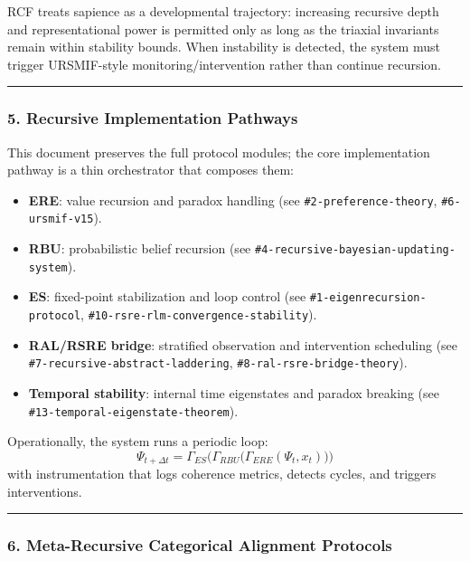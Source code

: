 \documentclass[
]{article}
\providecommand{\tightlist}{%
  \setlength{\itemsep}{0pt}\setlength{\parskip}{0pt}}
\begin{document}
RCF treats sapience as a developmental trajectory: increasing recursive
depth and representational power is permitted only as long as the
triaxial invariants remain within stability bounds. When instability is
detected, the system must trigger URSMIF-style monitoring/intervention
rather than continue recursion.

\begin{center}\rule{0.5\linewidth}{0.5pt}\end{center}

\subsubsection{\texorpdfstring{\textbf{5. Recursive Implementation
Pathways}}{5. Recursive Implementation Pathways}}\label{recursive-implementation-pathways}

This document preserves the full protocol modules; the core
implementation pathway is a thin orchestrator that composes them:

\begin{itemize}
\tightlist
\item
  \textbf{ERE}: value recursion and paradox handling (see
  \texttt{\#2-preference-theory}, \texttt{\#6-ursmif-v15}).
\item
  \textbf{RBU}: probabilistic belief recursion (see
  \texttt{\#4-recursive-bayesian-updating-system}).
\item
  \textbf{ES}: fixed-point stabilization and loop control (see
  \texttt{\#1-eigenrecursion-protocol},
  \texttt{\#10-rsre-rlm-convergence-stability}).
\item
  \textbf{RAL/RSRE bridge}: stratified observation and intervention
  scheduling (see \texttt{\#7-recursive-abstract-laddering},
  \texttt{\#8-ral-rsre-bridge-theory}).
\item
  \textbf{Temporal stability}: internal time eigenstates and paradox
  breaking (see \texttt{\#13-temporal-eigenstate-theorem}).
\end{itemize}

Operationally, the system runs a periodic loop: \[
\Psi_{t+\Delta t} = \Gamma_{ES}\!\Big(\Gamma_{RBU}\big(\Gamma_{ERE}(\Psi_t, x_t)\big)\Big)
\] with instrumentation that logs coherence metrics, detects cycles, and
triggers interventions.

\begin{center}\rule{0.5\linewidth}{0.5pt}\end{center}

\subsubsection{\texorpdfstring{\textbf{6. Meta-Recursive Categorical
Alignment
Protocols}}{6. Meta-Recursive Categorical Alignment Protocols}}\label{meta-recursive-categorical-alignment-protocols}
\end{document}
